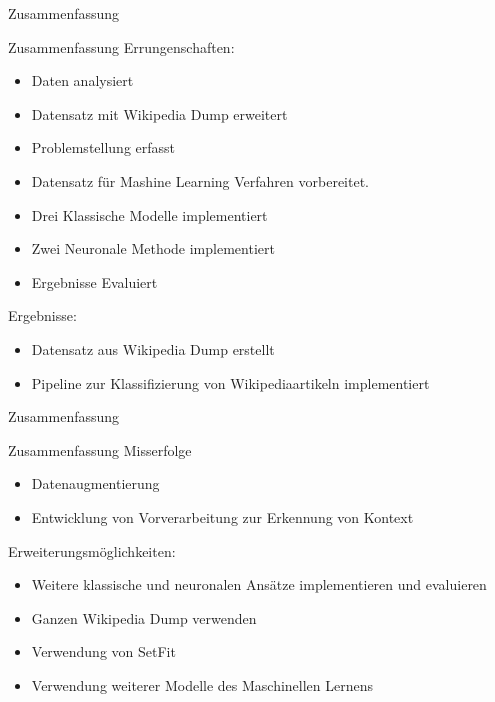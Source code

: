 \documentclass[aspectratio=169]{beamer} %
\begin{document}
\begin{frame}{Zusammenfassung}
    \begin{block}{Zusammenfassung}
        Errungenschaften:
        \begin{itemize}
            \item Daten analysiert
            \item Datensatz mit Wikipedia Dump erweitert
            \item Problemstellung erfasst
            \item Datensatz für Mashine Learning Verfahren vorbereitet.
            \item Drei Klassische Modelle implementiert
            \item Zwei Neuronale Methode implementiert
            \item Ergebnisse Evaluiert
        \end{itemize}
        Ergebnisse:
        \begin{itemize}
            \item Datensatz aus Wikipedia Dump erstellt
            \item Pipeline zur Klassifizierung von Wikipediaartikeln implementiert
        \end{itemize}
    \end{block}
\end{frame}

\begin{frame}{Zusammenfassung}
    \begin{block}{Zusammenfassung}
        Misserfolge
        \begin{itemize}
            \item Datenaugmentierung
            \item Entwicklung von Vorverarbeitung zur Erkennung von Kontext
        \end{itemize}
        Erweiterungsmöglichkeiten:
        \begin{itemize}
            \item Weitere klassische und neuronalen Ansätze implementieren und evaluieren
            \item Ganzen Wikipedia Dump verwenden
            \item Verwendung von SetFit
            \item Verwendung weiterer Modelle des Maschinellen Lernens
        \end{itemize}
    \end{block}
\end{frame}

\appendix

\end{document}
